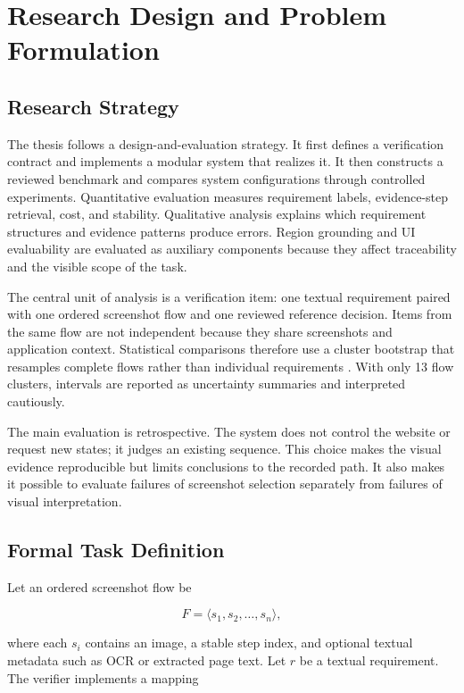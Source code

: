 \chapter{Research Design and Problem Formulation}\label{research-design-and-problem-formulation}

\section{Research Strategy}\label{research-strategy}

The thesis follows a design-and-evaluation strategy. It first defines a
verification contract and implements a modular system that realizes it. It then
constructs a reviewed benchmark and compares system configurations through
controlled experiments. Quantitative evaluation measures requirement labels,
evidence-step retrieval, cost, and stability. Qualitative analysis explains
which requirement structures and evidence patterns produce errors. Region
grounding and UI evaluability are evaluated as auxiliary components because
they affect traceability and the visible scope of the task.

The central unit of analysis is a verification item: one textual requirement
paired with one ordered screenshot flow and one reviewed reference decision.
Items from the same flow are not independent because they share screenshots and
application context. Statistical comparisons therefore use a cluster bootstrap
that resamples complete flows rather than individual requirements
\autocite{fieldwelsh2007}. With only 13 flow clusters, intervals are
reported as uncertainty summaries and interpreted cautiously.

The main evaluation is retrospective. The system does not control the website
or request new states; it judges an existing sequence. This choice makes the
visual evidence reproducible but limits conclusions to the recorded path. It
also makes it possible to evaluate failures of screenshot selection separately
from failures of visual interpretation.

\section{Formal Task Definition}\label{formal-task-definition}

Let an ordered screenshot flow be

\[
F = \langle s_1, s_2, \ldots, s_n \rangle,
\]

where each \(s_i\) contains an image, a stable step index, and optional textual
metadata such as OCR or extracted page text. Let \(r\) be a textual
requirement. The verifier implements a mapping

